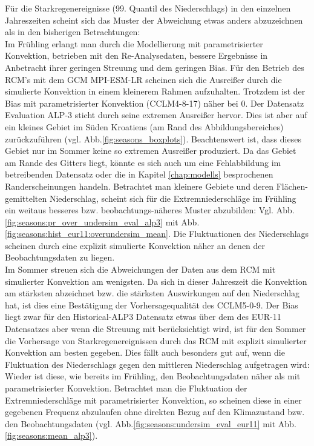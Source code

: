Für die Starkregenereignisse (99. Quantil des Niederschlags) in den einzelnen Jahreszeiten scheint sich das Muster der Abweichung etwas anders abzuzeichnen als in den bisherigen Betrachtungen:\\
Im Frühling erlangt man durch die Modellierung mit parametrisierter Konvektion, betrieben mit den Re-Analysedaten, bessere Ergebnisse in Anbetracht ihrer geringen Streuung und dem geringen Bias. Für den Betrieb des RCM's mit dem GCM MPI-ESM-LR scheinen sich die Ausreißer durch die simulierte Konvektion in einem kleinerem Rahmen aufzuhalten. Trotzdem ist der Bias mit parametrisierter Konvektion (CCLM4-8-17) näher bei 0. Der Datensatz Evaluation ALP-3 sticht durch seine extremen Ausreißer hervor. Dies ist aber auf ein kleines Gebiet im Süden Kroatiens (am Rand des Abbildungsbereiches) zurückzuführen (vgl. Abb.\ref{fig:seasons_boxplots}). Beachtenswert ist, dass dieses Gebiet nur im Sommer keine so extremen Ausreißer produziert. Da das Gebiet am Rande des Gitters liegt, könnte es sich auch um eine Fehlabbildung im betreibenden Datensatz oder die in Kapitel \ref{chap:modells} besprochenen Randerscheinungen handeln. Betrachtet man kleinere Gebiete und deren Flächen-gemittelten Niederschlag, scheint sich für die Extremniederschläge im Frühling ein weitaus besseres bzw. beobachtungs-näheres Muster abzubilden: Vgl. Abb.\ref{fig:seasons:pr_over_undersim_eval_alp3} mit Abb.\ref{fig:seasons:hist_eur11:overundersim_mean}. Die Fluktuationen des Niederschlags scheinen durch eine explizit simulierte Konvektion näher an denen der Beobachtungsdaten zu liegen.\\
Im Sommer streuen sich die Abweichungen der Daten aus dem RCM mit simulierter Konvektion am wenigsten. Da sich in dieser Jahreszeit die Konvektion am stärksten abzeichnet bzw. die stärksten Auswirkungen auf den Niederschlag hat, ist dies eine Bestätigung der Vorhersagequalität des CCLM5-0-9. Der Bias liegt zwar für den Historical-ALP3 Datensatz etwas über dem des EUR-11 Datensatzes aber wenn die Streuung mit berücksichtigt wird, ist für den Sommer die Vorhersage von Starkregenereignissen durch das RCM mit explizit simulierter Konvektion am besten gegeben. Dies fällt auch besonders gut auf, wenn die Fluktuation des Niederschlags gegen den mittleren Niederschlag aufgetragen wird: Wieder ist diese, wie bereits im Frühling, den Beobachtungsdaten näher als mit parametrisierter Konvektion. Betrachtet man die Fluktuation der Extremniederschläge mit parametrisierter Konvektion, so scheinen diese in einer gegebenen Frequenz abzulaufen ohne direkten Bezug auf den Klimazustand bzw. den Beobachtungsdaten (vgl. Abb.\ref{fig:seasons:undersim_eval_eur11} mit Abb.\ref{fig:seasons:mean_alp3}).\\
